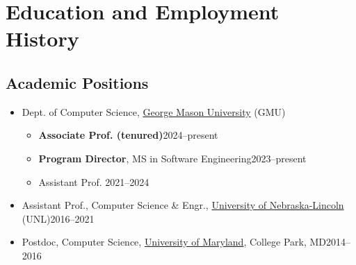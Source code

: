 \documentclass[11pt]{article}
\begin{document}


\section{Education and Employment History}
\subsection{Academic Positions}

\begin{itemize}
    \item Dept. of Computer Science, \href{https://cs.gmu.edu}{George Mason University} (GMU)
    \begin{itemize}
        \item \textbf{Associate Prof. (tenured)}\hfill 2024--present
        \item \textbf{Program Director}, MS in Software Engineering\hfill 2023--present
        \item Assistant Prof. \hfill 2021--2024
        
    \end{itemize}
    
    \item Assistant Prof., Computer Science \& Engr., \href{https://computing.unl.edu}{University of Nebraska-Lincoln} (UNL)\hfill 2016--2021
    
    \item Postdoc, Computer Science,  \href{https://www.umd.edu}{University of Maryland}, College Park, MD\hfill 2014--2016

\end{itemize}
\end{document}
